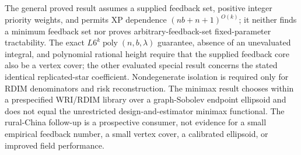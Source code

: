 \documentclass{article}
\begin{document}
The general proved result assumes a supplied feedback set, positive integer priority weights, and permits XP dependence \((nb+n+1)^{O(k)}\); it neither finds a minimum feedback set nor proves arbitrary-feedback-set fixed-parameter tractability. The exact \(L6^k\operatorname{poly}(n,b,\lambda)\) guarantee, absence of an unevaluated integral, and polynomial rational height require that the supplied feedback core also be a vertex cover; the other evaluated special result concerns the stated identical replicated-star coefficient. Nondegenerate isolation is required only for RDIM denominators and risk reconstruction. The minimax result chooses within a prespecified WRI/RDIM library over a graph-Sobolev endpoint ellipsoid and does not equal the unrestricted design-and-estimator minimax functional. The rural-China follow-up is a prospective consumer, not evidence for a small empirical feedback number, a small vertex cover, a calibrated ellipsoid, or improved field performance.
\end{document}
